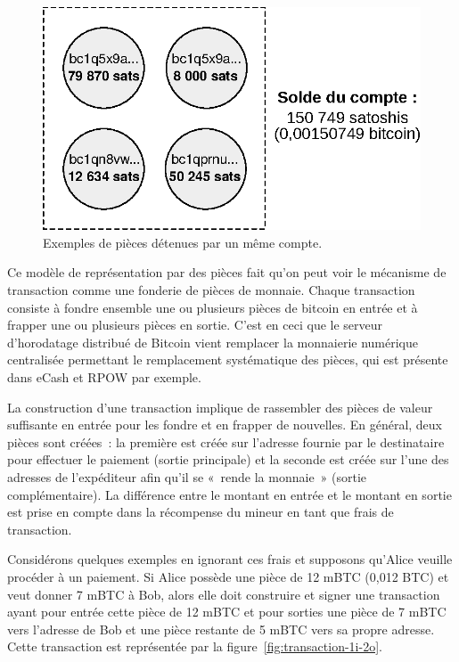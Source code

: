 \begin{figure}[h]
  \centering
  \includegraphics[scale=0.75]{img/coins-utxos-account.eps}
  \caption{Exemples de pièces détenues par un même compte.}
  \label{fig:coins-utxos}
\end{figure}

Ce modèle de représentation par des pièces fait qu'on peut voir le mécanisme de transaction comme une fonderie de pièces de monnaie. Chaque transaction consiste à fondre ensemble une ou plusieurs pièces de bitcoin en entrée et à frapper une ou plusieurs pièces en sortie. C'est en ceci que le serveur d'horodatage distribué de Bitcoin vient remplacer la monnaierie numérique centralisée permettant le remplacement systématique des pièces, qui est présente dans eCash et RPOW par exemple.

La construction d'une transaction implique de rassembler des pièces de valeur suffisante en entrée pour les fondre et en frapper de nouvelles. En général, deux pièces sont créées~: la première est créée sur l'adresse fournie par le destinataire pour effectuer le paiement (sortie principale) et la seconde est créée sur l'une des adresses de l'expéditeur afin qu'il se «~rende la monnaie~» (sortie complémentaire). La différence entre le montant en entrée et le montant en sortie est prise en compte dans la récompense du mineur en tant que frais de transaction.

Considérons quelques exemples en ignorant ces frais et supposons qu'Alice veuille procéder à un paiement. Si Alice possède une pièce de 12 mBTC (0,012 BTC) et veut donner 7 mBTC à Bob, alors elle doit construire et signer une transaction ayant pour entrée cette pièce de 12 mBTC et pour sorties une pièce de 7 mBTC vers l'adresse de Bob et une pièce restante de 5 mBTC vers sa propre adresse. Cette transaction est représentée par la figure~\ref{fig:transaction-1i-2o}.

